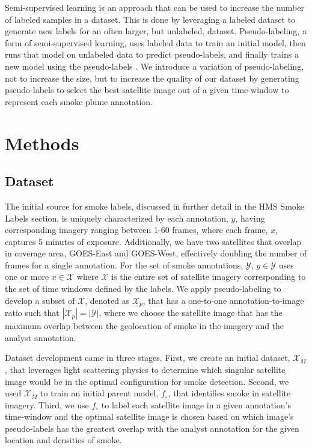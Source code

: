 \documentclass{article}
\begin{document}
Semi-supervised learning is an approach that can be used to increase the number of labeled samples in a dataset. This is done by leveraging a labeled dataset to generate new labels for an often larger, but unlabeled, dataset. Pseudo-labeling, a form of semi-supervised learning, uses labeled data to train an initial model, then runs that model on unlabeled data to predict pseudo-labels, and finally trains a new model using the pseudo-labels \cite{pseudo}. We introduce a variation of pseudo-labeling, not to increase the size, but to increase the quality of our dataset by generating pseudo-labels to select the best satellite image out of a given time-window to represent each smoke plume annotation.


\section{Methods}
\subsection*{Dataset}

The initial source for smoke labels, discussed in further detail in the HMS Smoke Labels section, is uniquely characterized by each annotation, \(y\), having corresponding imagery ranging between 1-60 frames, where each frame, \(x\), captures 5 minutes of exposure. Additionally, we have two satellites that overlap in coverage area, GOES-East and GOES-West, effectively doubling the number of frames for a single annotation. For the set of smoke annotations, \(\mathcal{Y}\), \(y \in \mathcal{Y}\) uses one or more \(x \in \mathcal{X}\) where \(\mathcal{X}\) is the entire set of satellite imagery corresponding to the set of time windows defined by the labels. We apply pseudo-labeling to develop a subset of \(\mathcal{X}\), denoted as \(\mathcal{X}_p\), that has a one-to-one annotation-to-image ratio such that \(|\mathcal{X}_p| = |\mathcal{Y}|\), where we choose the satellite image that has the maximum overlap between the geolocation of smoke in the imagery and the analyst annotation.

Dataset development came in three stages. First, we create an initial dataset, \(\mathcal{X}_M\), that leverages light scattering physics to determine which singular satellite image would be in the optimal configuration for smoke detection. Second, we used \(\mathcal{X}_M\) to train an initial parent model, \(f_{\circ}\), that identifies smoke in satellite imagery. Third, we use \(f_{\circ}\) to label each satellite image in a given annotation's time-window and the optimal satellite image is chosen based on which image's pseudo-labels has the greatest overlap with the analyst annotation for the given location and densities of smoke.
\end{document}
